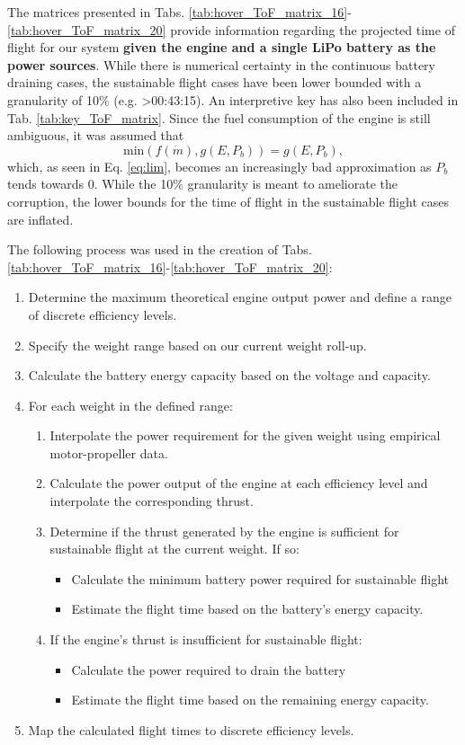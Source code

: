 \documentclass{article}
\begin{document}
The matrices presented in Tabs. \ref{tab:hover_ToF_matrix_16}-\ref{tab:hover_ToF_matrix_20} provide information regarding the projected time of flight for our system \textbf{given the engine and a single LiPo battery as the power sources}. While there is numerical certainty in the continuous battery draining cases, the sustainable flight cases have been lower bounded with a granularity of 10\% (e.g. >00:43:15). An interpretive key has also been included in Tab. \ref{tab:key_ToF_matrix}. Since the fuel consumption of the engine is still ambiguous, it was assumed that 
\begin{equation}
    \text{min}(f(\dot{m}), g(E, P_{b})) = g(E, P_b),
\end{equation}
which, as seen in Eq. \ref{eq:lim}, becomes an increasingly bad approximation as $P_b$ tends towards $0$. While the 10\% granularity is meant to ameliorate the corruption, the lower bounds for the time of flight in the sustainable flight cases are inflated. 

The following process was used in the creation of Tabs. \ref{tab:hover_ToF_matrix_16}-\ref{tab:hover_ToF_matrix_20}:
\begin{enumerate}
    \item Determine the maximum theoretical engine output power and define a range of discrete efficiency levels.
    \item Specify the weight range based on our current weight roll-up.
    \item Calculate the battery energy capacity based on the voltage and capacity.
    \item For each weight in the defined range:
    \begin{enumerate}
        \item Interpolate the power requirement for the given weight using empirical motor-propeller data.
        \item Calculate the power output of the engine at each efficiency level and interpolate the corresponding thrust.
        \item Determine if the thrust generated by the engine is sufficient for sustainable flight at the current weight. If so:
        \begin{itemize}
            \item Calculate the minimum battery power required for sustainable flight 
            \item Estimate the flight time based on the battery's energy capacity.
        \end{itemize}
        \item If the engine's thrust is insufficient for sustainable flight:
        \begin{itemize}
            \item Calculate the power required to drain the battery
            \item Estimate the flight time based on the remaining energy capacity.
        \end{itemize}
    \end{enumerate}
    \item Map the calculated flight times to discrete efficiency levels.
\end{enumerate}
\end{document}
